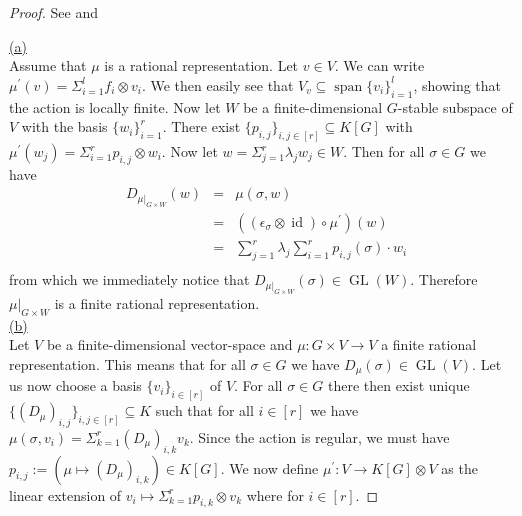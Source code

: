 \begin{proof}
  See \cite[A.1.8]{DK15} and \cite[2.2.5(b)$\implies$(c), 2.2.6]{DK15}

  \underline{(a)}\\
  Assume that $\mu$ is a rational representation.
  Let $v \in V$.
  We can write $\mu^\prime (v) = \Sigma_{i=1}^l f_i \otimes v_i$. %
  We then easily see that $V_v \subseteq \operatorname{span}\{v_i\}_{i=1}^l$, showing that the action is locally finite.
  Now let $W$ be a finite-dimensional $G$-stable subspace of $V$ with the basis $\{w_i\}_{i=1}^r$.
  There exist $\{p_{i,j}\}_{i,j \in [r]} \subseteq K[G]$ with $ \mu^\prime (w_j) = \Sigma_{i=1}^r p_{i,j} \otimes w_i$.
  Now let $w = \Sigma_{j=1}^r \lambda_j w_j \in W$.
  Then for all $\sigma \in G$ we have
  \begin{equation}
    \begin{aligned}
      &D_{\left. \mu \right|_{G \times W}} (w)
      &=&\mu (\sigma,w)\\
      &&=& \left(\left(\epsilon_\sigma \otimes \operatorname{id} \right) \circ \mu^\prime \right) \left(w \right) \\
      &&=& \sum_{j=1}^r \lambda_j  \sum_{i=1}^r p_{i,j}\left(\sigma\right) \cdot w_i \\
    \end{aligned}
  \end{equation}
  from which we immediately notice that $D_{\left. \mu \right|_{G \times W}} (\sigma) \in \operatorname{GL}(W)$.
  Therefore $\left. \mu \right|_{G\times W}$ is a finite rational representation.\\
  \underline{(b)}\\
  Let $V$ be a finite-dimensional vector-space and $\mu \colon G \times V \longrightarrow V$ a finite rational representation.
  This means that for all $\sigma \in G$ we have $D_\mu (\sigma) \in \operatorname{GL}(V)$.
  Let us now choose a basis $\{v_i\}_{i \in [r]}$ of $V$.
  For all $\sigma \in G$ there then exist unique $\{ \left( D_\mu \right)_{i,j}\}_{i,j \in [r]} \subseteq K$ such that for all $i \in [r]$ we have $\mu (\sigma,v_i) = \Sigma_{k=1}^r \left(D_\mu\right)_{i,k} v_k$.
  Since the action is regular, we must have $p_{i,j} := \left( \mu \mapsto \left(D_\mu\right)_{i,k}\right) \in K[G]$.
  We now define $\mu^\prime \colon V \longrightarrow K[G] \otimes V$ as the linear extension of $v_i \mapsto \Sigma_{k=1}^r p_{i,k} \otimes v_k$ where for $i \in [r]$.

\end{proof}
